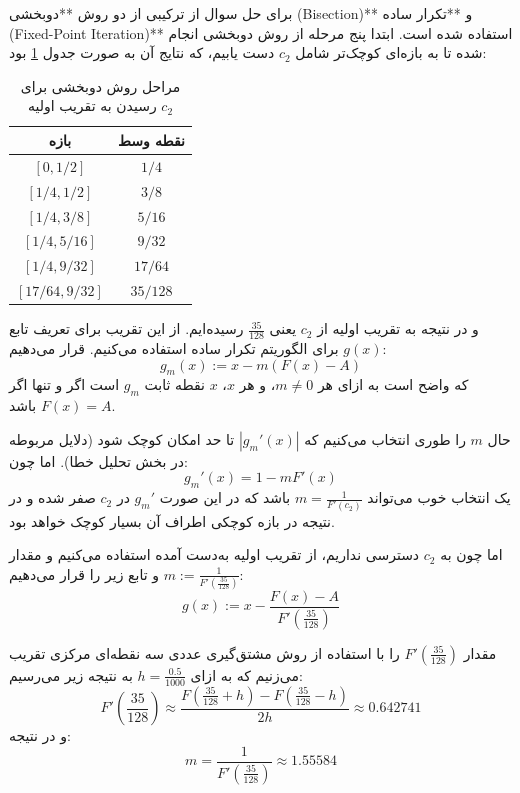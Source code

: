 \documentclass[12pt,a4paper]{article}
\begin{document}
برای حل سوال از ترکیبی از دو روش **دوبخشی (Bisection)** و **تکرار ساده (Fixed-Point Iteration)** استفاده شده است. ابتدا پنج مرحله از روش دوبخشی انجام شده تا به بازه‌ای کوچک‌تر شامل $c_2$ دست یابیم، که نتایج آن به صورت جدول \ref{tab:bisection_steps} بود:

\begin{table}[h]
\centering
\caption{مراحل روش دوبخشی برای رسیدن به تقریب اولیه $c_2$}
\label{tab:bisection_steps}
\vspace{0.2cm}
\begin{tabular}{cc}
\toprule
\textbf{بازه} & \textbf{نقطه وسط} \\
\midrule
$[0, 1/2]$ & $1/4$ \\
$[1/4, 1/2]$ & $3/8$ \\
$[1/4, 3/8]$ & $5/16$ \\
$[1/4, 5/16]$ & $9/32$ \\
$[1/4, 9/32]$ & $17/64$ \\
$[17/64, 9/32]$ & $35/128$ \\
\bottomrule
\end{tabular}
\end{table}

\newpage
و در نتیجه به تقریب اولیه از $c_2$ یعنی $\frac{35}{128}$ رسیده‌ایم. از این تقریب برای تعریف تابع $g(x)$ برای الگوریتم تکرار ساده استفاده می‌کنیم. قرار می‌دهیم:
\begin{equation*}
g_m(x) := x - m(F(x) - A)
\end{equation*}
که واضح است به ازای هر $m \neq 0$، و هر $x$، $x$ نقطه ثابت $g_m$ است اگر و تنها اگر $F(x) = A$ باشد.

حال $m$ را طوری انتخاب می‌کنیم که $|g_m'(x)|$ تا حد امکان کوچک شود (دلایل مربوطه در بخش تحلیل خطا). اما چون:
\begin{equation*}
g_m'(x) = 1 - m F'(x)
\end{equation*}
یک انتخاب خوب می‌تواند $m = \frac{1}{F'(c_2)}$ باشد که در این صورت $g_m'$ در $c_2$ صفر شده و در نتیجه در بازه کوچکی اطراف آن بسیار کوچک خواهد بود.

اما چون به $c_2$ دسترسی نداریم، از تقریب اولیه به‌دست آمده استفاده می‌کنیم و مقدار $m := \frac{1}{F'(\frac{35}{128})}$ و تابع زیر را قرار می‌دهیم:
\begin{equation*}
g(x) := x - \frac{F(x) - A}{F'\left(\frac{35}{128}\right)}
\end{equation*}

مقدار $F'\left(\frac{35}{128}\right)$ را با استفاده از روش مشتق‌گیری عددی سه نقطه‌ای مرکزی تقریب می‌زنیم که به ازای $h = \frac{0.5}{1000}$ به نتیجه زیر می‌رسیم:
\begin{equation*}
F'\left(\frac{35}{128}\right) \approx \frac{F\left(\frac{35}{128} + h\right) - F\left(\frac{35}{128} - h\right)}{2h} \approx 0.642741
\end{equation*}
و در نتیجه:
\begin{equation*}
m = \frac{1}{F'\left(\frac{35}{128}\right)} \approx 1.55584
\end{equation*}
\end{document}
